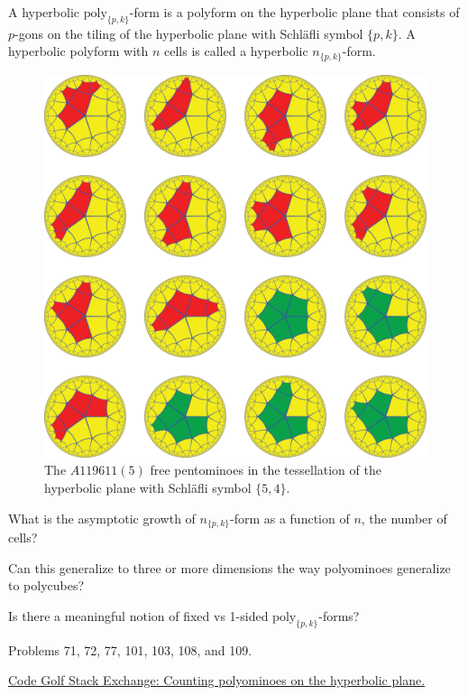 \documentclass{article}
\begin{document}
A hyperbolic $\mathrm{poly}_{\{p,k\}}$-form is a polyform on the hyperbolic plane that
consists of $p$-gons on the tiling of the hyperbolic plane with Schl\"afli
symbol $\{p,k\}$.
A hyperbolic polyform with $n$ cells is called a hyperbolic $n_{\{p,k\}}$-form.

\begin{figure}[ht!]
  \centering
  \includegraphics[scale=0.15]{assets/120_problem/5_4_hyperbolic_polyominoes.png}
  \caption{
    The $A119611(5)$ free pentominoes in the tessellation of the
    hyperbolic plane with Schl\"afli symbol $\{5,4\}$.
  }
\end{figure}

\begin{question}
  What is the asymptotic growth of $n_{\{p,k\}}$-form as a function of $n$,
  the number of cells?
\end{question}

\begin{related}
  \item Can this generalize to three or more dimensions the way polyominoes
  generalize to polycubes?
  \item Is there a meaningful notion of fixed vs 1-sided
    $\mathrm{poly}_{\{p,k\}}$-forms?
\end{related}


\begin{references}
  \item Problems 71, 72, 77, 101, 103, 108, and 109.
  \item \href{https://codegolf.stackexchange.com/q/200122/53884}{Code Golf Stack Exchange: Counting polyominoes on the hyperbolic plane.}
\end{references}
\end{document}

